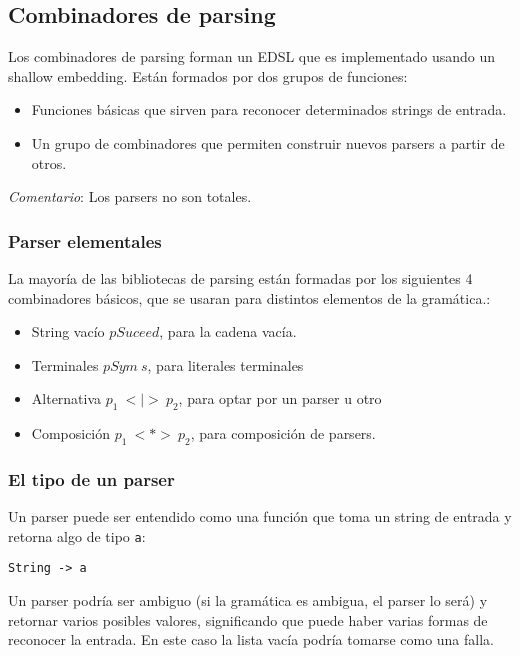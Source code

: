 \documentclass{article}
\newcommand{\imp}[1]{\textcolor{color1}{#1}}
\begin{document}
\subsection{Combinadores de parsing}\label{subsec:sombinadores_de_parsing}

Los combinadores de parsing forman un EDSL que es implementado usando un shallow embedding. Están formados por dos grupos de funciones:

\begin{itemize}
\item Funciones básicas que sirven para reconocer determinados strings de entrada.
\item Un grupo de combinadores que permiten construir nuevos parsers a partir de otros.
\end{itemize}

\imp{\emph{Comentario}}: Los parsers no son totales.

\subsubsection{Parser elementales}

La mayoría de las bibliotecas de parsing están formadas por los siguientes 4 combinadores básicos, que se usaran para distintos elementos de la gramática.:

\begin{itemize}
\item String vacío $pSuceed$, para la cadena vacía.
\item Terminales $pSym~s$, para literales terminales
\item Alternativa $p_1~<|>~p_2$, para optar por un parser u otro
\item Composición $p_1~<*>~p_2$, para composición de parsers.
\end{itemize}

\subsubsection{El tipo de un parser}

Un parser puede ser entendido como una función que toma un string de entrada y retorna algo de tipo \imp{\texttt{a}}:

\begin{lstlisting}
String -> a
\end{lstlisting}

Un parser podría ser ambiguo (si la gramática es ambigua, el parser lo será) y retornar varios posibles valores, significando que puede haber varias formas de reconocer la entrada. En este caso la lista vacía podría tomarse como una falla.
\end{document}
